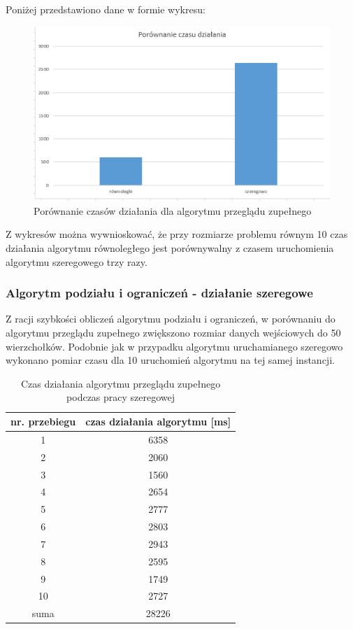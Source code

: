 \documentclass{article}
\begin{document}
			Poniżej przedstawiono dane w formie wykresu:
				\begin{figure}[H]
					\centering
					\includegraphics[width=0.9\linewidth]{bfRvsS}
					\caption{Porównanie czasów działania dla algorytmu przeglądu zupełnego}
				\end{figure}
				
			Z wykresów można wywnioskować, że przy rozmiarze problemu równym 10 czas działania algorytmu równoległego jest porównywalny z czasem uruchomienia algorytmu szeregowego trzy razy.
			
		\subsubsection{Algorytm podziału i ograniczeń - działanie szeregowe}
			Z racji szybkości obliczeń algorytmu podziału i ograniczeń, w porównaniu do algorytmu przeglądu zupełnego zwiększono rozmiar danych wejściowych do 50 wierzchołków. Podobnie jak w przypadku algorytmu uruchamianego szeregowo wykonano pomiar czasu dla 10 uruchomień algorytmu na tej samej instancji.
			\begin{table}[H]
				\centering
				\caption{Czas działania algorytmu przeglądu zupełnego podczas pracy szeregowej}
				\begin{tabular}{|c|c|}
					
					\hline nr. przebiegu  & czas działania algorytmu [ms] \\ 
					\hline  1 & 6358 \\ 
					\hline  2 & 2060 \\ 
					\hline  3 & 1560 \\ 
					\hline  4 & 2654 \\ 
					\hline  5 & 2777 \\ 
					\hline  6 & 2803 \\ 
					\hline  7 & 2943 \\ 
					\hline  8 & 2595 \\ 
					\hline  9 & 1749 \\ 
					\hline  10 & 2727 \\ 
					\hline  suma & 28226 \\ 
					\hline 
				\end{tabular} 
			\end{table}
	
\end{document}
